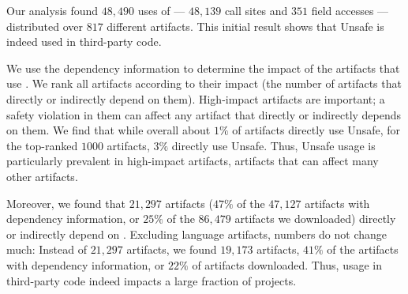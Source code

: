Our analysis found $48,490$ uses of  --- $48,139$ call sites and $351$ field accesses --- distributed over $817$ different artifacts.
This initial result shows that Unsafe is indeed used in third-party code.

We use the dependency information to determine the impact of the artifacts that use .
We rank all artifacts according to their impact (the number of artifacts that directly or indirectly depend on them).
High-impact artifacts are important;
a safety violation in them can affect any artifact that directly or indirectly depends on them.
We find that while overall about $1\%$ of artifacts directly use Unsafe,
for the top-ranked $1000$ artifacts, $3\%$ directly use Unsafe.
Thus, Unsafe usage is particularly prevalent in high-impact artifacts, artifacts that can affect many other artifacts.

Moreover, we found that $21,297$ artifacts ($47\%$ of the $47,127$ artifacts with dependency information, or $25\%$ of the $86,479$ artifacts we downloaded) directly or indirectly depend on .
Excluding language artifacts, numbers do not change much:
Instead of $21,297$ artifacts, we found $19,173$ artifacts,
$41\%$ of the artifacts with dependency information, or $22\%$ of artifacts downloaded.
Thus,  usage in third-party code indeed impacts a large fraction of projects.
